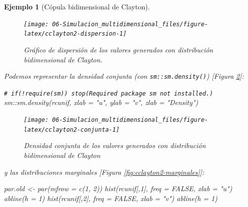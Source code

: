 \documentclass[
]{book}
\newenvironment{Shaded}{\begin{snugshade}}{\end{snugshade}}
\newcommand{\AttributeTok}[1]{\textcolor[rgb]{0.77,0.63,0.00}{#1}}
\newcommand{\CommentTok}[1]{\textcolor[rgb]{0.56,0.35,0.01}{\textit{#1}}}
\newcommand{\ConstantTok}[1]{\textcolor[rgb]{0.00,0.00,0.00}{#1}}
\newcommand{\DecValTok}[1]{\textcolor[rgb]{0.00,0.00,0.81}{#1}}
\newcommand{\FunctionTok}[1]{\textcolor[rgb]{0.00,0.00,0.00}{#1}}
\newcommand{\NormalTok}[1]{#1}
\newcommand{\OtherTok}[1]{\textcolor[rgb]{0.56,0.35,0.01}{#1}}
\newcommand{\SpecialCharTok}[1]{\textcolor[rgb]{0.00,0.00,0.00}{#1}}
\newcommand{\StringTok}[1]{\textcolor[rgb]{0.31,0.60,0.02}{#1}}
\theoremstyle{break}
\newtheorem{example}{Ejemplo}[chapter]
\theoremstyle{nonumberplain}
\renewcommand{\CommentTok}[1]{\textcolor[rgb]{0.41,0.41,0.41}{\texttt{#1}}}
\begin{document}
\begin{example}[Cópula bidimensional de Clayton]
\begin{figure}[!htb]

{\centering \texttt{[image: 06-Simulacion\_multidimensional\_files/figure-latex/cclayton2-dispersion-1]} 

}

\caption{Gráfico de dispersión de los valores generados con distribución bidimensional de Clayton.}\label{fig:cclayton2-dispersion}
\end{figure}

Podemos representar la densidad conjunta (con \texttt{sm::sm.density()}) {[}Figura \ref{fig:cclayton2-conjunta}{]}:

\begin{Shaded}
\begin{Highlighting}[]
\CommentTok{\# if(!require(sm)) stop(\textquotesingle{}Required package \textasciigrave{}sm\textasciigrave{} not installed.\textquotesingle{})}
\NormalTok{sm}\SpecialCharTok{::}\FunctionTok{sm.density}\NormalTok{(rcunif, }\AttributeTok{xlab =} \StringTok{"u"}\NormalTok{, }\AttributeTok{ylab =} \StringTok{"v"}\NormalTok{, }\AttributeTok{zlab =} \StringTok{"Density"}\NormalTok{)    }
\end{Highlighting}
\end{Shaded}

\begin{figure}[!htb]

{\centering \texttt{[image: 06-Simulacion\_multidimensional\_files/figure-latex/cclayton2-conjunta-1]} 

}

\caption{Densidad conjunta de los valores generados con distribución bidimensional de Clayton}\label{fig:cclayton2-conjunta}
\end{figure}

y las distribuciones marginales {[}Figura \ref{fig:cclayton2-marginales}{]}:

\begin{Shaded}
\begin{Highlighting}[]
\NormalTok{par.old }\OtherTok{\textless{}{-}} \FunctionTok{par}\NormalTok{(}\AttributeTok{mfrow =} \FunctionTok{c}\NormalTok{(}\DecValTok{1}\NormalTok{, }\DecValTok{2}\NormalTok{))}
\FunctionTok{hist}\NormalTok{(rcunif[,}\DecValTok{1}\NormalTok{], }\AttributeTok{freq =} \ConstantTok{FALSE}\NormalTok{, }\AttributeTok{xlab =} \StringTok{"u"}\NormalTok{)}
\FunctionTok{abline}\NormalTok{(}\AttributeTok{h =} \DecValTok{1}\NormalTok{)}
\FunctionTok{hist}\NormalTok{(rcunif[,}\DecValTok{2}\NormalTok{], }\AttributeTok{freq =} \ConstantTok{FALSE}\NormalTok{, }\AttributeTok{xlab =} \StringTok{"v"}\NormalTok{)}
\FunctionTok{abline}\NormalTok{(}\AttributeTok{h =} \DecValTok{1}\NormalTok{)}
\end{Highlighting}
\end{Shaded}


\end{example}
\end{document}
